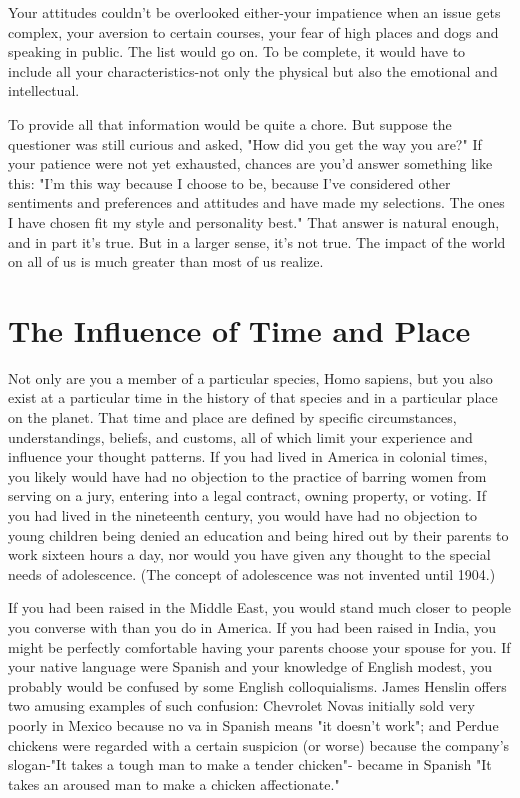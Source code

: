\documentclass{book}
\begin{document}
Your attitudes couldn’t be overlooked either-your impatience when an issue gets complex, your aversion to certain courses, your fear of high places and dogs and speaking in public. The list would go on. To be complete, it would have to include all your characteristics-not only the physical but also the emotional and intellectual.

To provide all that information would be quite a chore. But suppose the questioner was still curious and asked, "How did you get the way you are?" If your patience were not yet exhausted, chances are you’d answer something like this: "I’m this way because I choose to be, because I’ve considered other sentiments and preferences and attitudes and have made my selections. The ones I have chosen fit my style and personality best." That answer is natural enough, and in part it’s true. But in a larger sense, it’s not true. The impact of the world on all of us is much greater than most of us realize.

\section{The Influence of Time and Place}

Not only are you a member of a particular species, Homo sapiens, but you also exist at a particular time in the history of that species and in a particular place on the planet. That time and place are defined by specific circumstances, understandings, beliefs, and customs, all of which limit your experience and influence your thought patterns. If you had lived in America in colonial times, you likely would have had no objection to the practice of barring women from serving on a jury, entering into a legal contract, owning property, or voting. If you had lived in the nineteenth century, you would have had no objection to young children being denied an education and being hired out by their parents to work sixteen hours a day, nor would you have given any thought to the special needs of adolescence. (The concept of adolescence was not invented until 1904.)

If you had been raised in the Middle East, you would stand much closer to people you converse with than you do in America. If you had been raised in India, you might be perfectly comfortable having your parents choose your spouse for you. If your native language were Spanish and your knowledge of English modest, you probably would be confused by some English colloquialisms. James Henslin offers two amusing examples of such confusion: Chevrolet Novas initially sold very poorly in Mexico because no va in Spanish means "it doesn’t work"; and Perdue chickens were regarded with a certain suspicion (or worse) because the company’s slogan-"It takes a tough man to make a tender chicken"- became in Spanish "It takes an aroused man to make a chicken affectionate."
\end{document}

